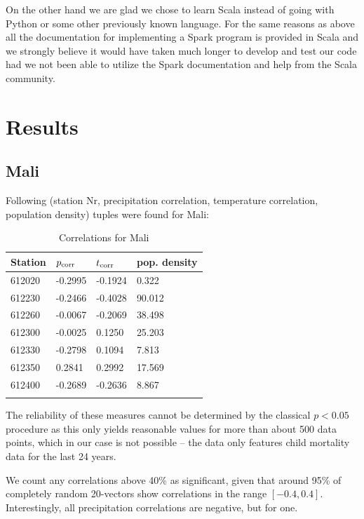 \documentclass[
10pt, %
a4paper, %
oneside, %
headinclude,footinclude, %
useAMS,
usenatbib
]{mn2e}  %
\begin{document}
On the other hand we are glad we chose to learn Scala instead of going with Python or some other previously known language. For the same reasons as above all the documentation for implementing a Spark program is provided in Scala and we strongly believe it would have taken much longer to develop and test our code had we not been able to utilize the Spark documentation and help from the Scala community.

\section{Results}
\subsection{Mali}
Following (station Nr, precipitation correlation, temperature
correlation, population density) tuples were found for Mali:

\begin{table}
    \caption{Correlations for Mali}
    \begin{tabular}{ l l l l }
        \hline\hline
        Station & $p_{\rm corr}$ & $t_{\rm corr}$ & pop. density\\
        \hline
        612020 & -0.2995 & -0.1924 &  0.322\\
        612230 & -0.2466 & -0.4028 & 90.012\\
        612260 & -0.0067 & -0.2069 & 38.498\\
        612300 & -0.0025 &  0.1250 & 25.203\\
        612330 & -0.2798 &  0.1094 &  7.813\\
        612350 &  0.2841 &  0.2992 & 17.569\\
        612400 & -0.2689 & -0.2636 &  8.867\\
        \hline
        \label{tab:MI}
    \end{tabular}
\end{table}


The reliability of these measures cannot be determined by the classical $p<0.05$ procedure as this only yields reasonable values for more than about 500 data points, which in our case is not possible -- the data only features child mortality data for the last 24 years.

We count any correlations above 40\% as significant, given that around 95\% of completely random 20-vectors show correlations in the range $[-0.4, 0.4]$.
Interestingly, all precipitation correlations are negative, but for
one.
\end{document}

